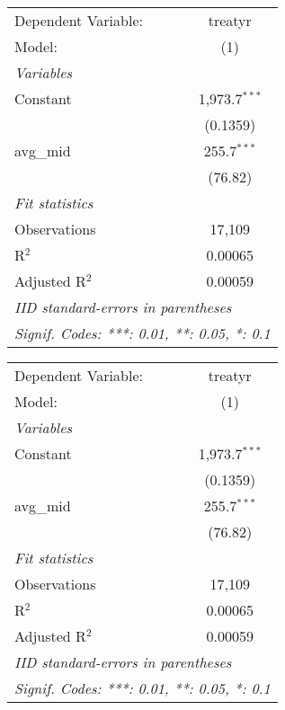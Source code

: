
\begingroup
\centering
\begin{tabular}{lc}
   \tabularnewline \midrule \midrule
   Dependent Variable: & treatyr\\  
   Model:              & (1)\\  
   \midrule
   \emph{Variables}\\
   Constant            & 1,973.7$^{***}$\\   
                       & (0.1359)\\   
   avg\_mid            & 255.7$^{***}$\\   
                       & (76.82)\\   
   \midrule
   \emph{Fit statistics}\\
   Observations        & 17,109\\  
   R$^2$               & 0.00065\\  
   Adjusted R$^2$      & 0.00059\\  
   \midrule \midrule
   \multicolumn{2}{l}{\emph{IID standard-errors in parentheses}}\\
   \multicolumn{2}{l}{\emph{Signif. Codes: ***: 0.01, **: 0.05, *: 0.1}}\\
\end{tabular}
\par\endgroup



\begingroup
\centering
\begin{tabular}{lc}
   \tabularnewline \midrule \midrule
   Dependent Variable: & treatyr\\  
   Model:              & (1)\\  
   \midrule
   \emph{Variables}\\
   Constant            & 1,973.7$^{***}$\\   
                       & (0.1359)\\   
   avg\_mid            & 255.7$^{***}$\\   
                       & (76.82)\\   
   \midrule
   \emph{Fit statistics}\\
   Observations        & 17,109\\  
   R$^2$               & 0.00065\\  
   Adjusted R$^2$      & 0.00059\\  
   \midrule \midrule
   \multicolumn{2}{l}{\emph{IID standard-errors in parentheses}}\\
   \multicolumn{2}{l}{\emph{Signif. Codes: ***: 0.01, **: 0.05, *: 0.1}}\\
\end{tabular}
\par\endgroup



